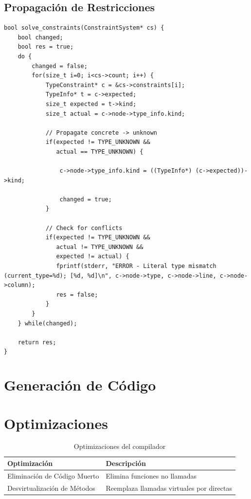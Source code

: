 \documentclass[11pt]{article}
\begin{document}
\subsection{Propagación de Restricciones}
\begin{lstlisting}
bool solve_constraints(ConstraintSystem* cs) {
    bool changed;
    bool res = true;
    do {
        changed = false;
        for(size_t i=0; i<cs->count; i++) {
            TypeConstraint* c = &cs->constraints[i];
            TypeInfo* t = c->expected;
            size_t expected = t->kind;
            size_t actual = c->node->type_info.kind;

            // Propagate concrete -> unknown
            if(expected != TYPE_UNKNOWN &&
               actual == TYPE_UNKNOWN) {

                c->node->type_info.kind = ((TypeInfo*) (c->expected))->kind;

                changed = true;
            }

            // Check for conflicts
            if(expected != TYPE_UNKNOWN &&
               actual != TYPE_UNKNOWN &&
               expected != actual) {
               fprintf(stderr, "ERROR - Literal type mismatch (current_type=%d); [%d, %d]\n", c->node->type, c->node->line, c->node->column);
               res = false;
            }
        }
    } while(changed);

    return res;
}
\end{lstlisting}

\section{Generación de Código}

\section{Optimizaciones}
\begin{table}[h]
\centering
\begin{tabularx}{\textwidth}{|l|X|}
\hline
\textbf{Optimización} & \textbf{Descripción} \\
\hline
Eliminación de Código Muerto & Elimina funciones no llamadas \\
Desvirtualización de Métodos & Reemplaza llamadas virtuales por directas \\
\hline
\end{tabularx}
\caption{Optimizaciones del compilador}
\end{table}
\end{document}
